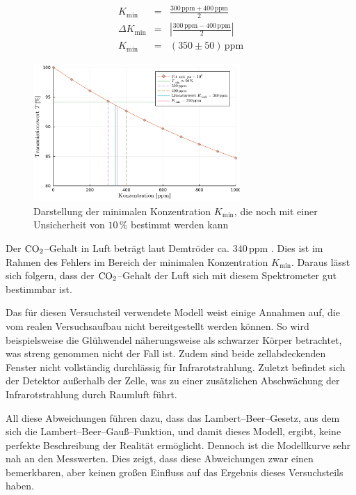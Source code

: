 \documentclass[12pt,a4paper]{scrartcl}
\numberwithin{equation}{section} %
\begin{document}
\begin{eqnarray}
	K_\mathrm{min} &=&  \frac{300 \mathrm{\, ppm} + 400 \mathrm{\, ppm}}{2} \\
	\Delta K_\mathrm{min} &=& \left|\frac{300 \mathrm{\, ppm} - 400 \mathrm{\, ppm}}{2}\right| \\
	K_\mathrm{min} &=& (350 \pm 50) \mathrm{\, ppm}
\end{eqnarray}

\begin{figure}[h]
	\centering
	\includegraphics[width=0.7\textwidth]{../media/B1.1/fitZoomPpm.pdf}
	\caption{Darstellung der minimalen Konzentration $K_\mathrm{min}$,
		die noch mit einer Unsicherheit von $10 \mathrm{\, \%}$ bestimmt werden kann}
	\label{abb:fitZoom}
\end{figure}

\noindent
Der $\ce{CO_2}$--Gehalt in Luft beträgt laut Demtröder ca. $340 \mathrm{\, ppm}$ \cite{Demtröder Kern/Atom}.
Dies ist im Rahmen des Fehlers im Bereich der minimalen Konzentration $K_\mathrm{min}$. Daraus lässt sich folgern, dass der $\ce{CO_2}$--Gehalt der Luft sich mit diesem Spektrometer gut bestimmbar ist.

Das für diesen Versuchsteil verwendete Modell weist einige Annahmen auf, die vom realen Versuchsaufbau nicht bereitgestellt werden können. So wird beispielsweise die Glühwendel näherungsweise als schwarzer Körper betrachtet, was streng genommen nicht der Fall ist. Zudem sind beide zellabdeckenden Fenster nicht vollständig durchlässig für Infrarotstrahlung. Zuletzt befindet sich der Detektor außerhalb der Zelle, was zu einer zusätzlichen Abschwächung der Infrarotstrahlung durch Raumluft führt.

All diese Abweichungen führen dazu, dass das Lambert--Beer--Gesetz, aus dem sich die Lambert--Beer--Gauß--Funktion, und damit dieses Modell, ergibt, keine perfekte Beschreibung der Realität ermöglicht. Dennoch ist die Modellkurve sehr nah an den Messwerten. Dies zeigt, dass diese Abweichungen zwar einen bemerkbaren, aber keinen großen Einfluss auf das Ergebnis dieses Versuchsteils haben.
\end{document}

